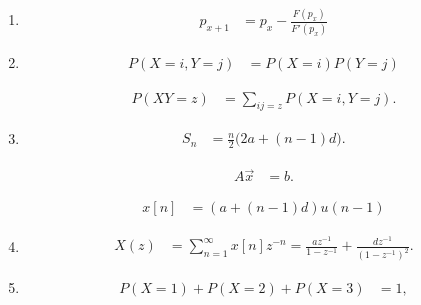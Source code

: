 \begin{enumerate}[label=\thesubsection.\arabic*, ref=\thesubsection.\theenumi, leftmargin=12mm, itemsep=4pt]

    \setcounter{enumi}{0}
    \item[\ref{question-short:C10-Q01}]
    \begin{align}
        p_{x+1} &= p_x-\frac{F(p_x)}{F'(p_x)}
        \label{formula:C10-Q01-F02}
    \end{align}

    \setcounter{enumi}{1}
    \item[\ref{question-short:C10-Q03}]
    \begin{align}
        P(X=i,Y=j) &= P(X=i)P(Y=j)
        \label{formula:C10-Q03-F01}
    \end{align}

    \begin{align}
        P(XY=z) &= \sum_{ij=z}P(X=i,Y=j).
        \label{formula:C10-Q03}
    \end{align}

    \setcounter{enumi}{2}
    \item[\ref{question-short:C10-Q08}]
    \begin{align}
        S_n &= \frac n2\bigl(2a+(n-1)d\bigr).
        \label{formula:C10-Q08-F01}
    \end{align}

    \begin{align}
	A\vec{x} &= b.
        \label{formula:C10-Q08}
    \end{align}

    \begin{align}
	    x[n] &=(a+(n-1)d)u(n-1)
	     \label{formula:C10-Q08-F03}
    \end{align}

    \setcounter{enumi}{4}
    \item[\ref{question-short:C10-Q11}]
    \begin{align}
        X(z) &= \sum_{n=1}^{\infty}x[n]z^{-n}
        = \frac{az^{-1}}{1-z^{-1}}
        + \frac{dz^{-1}}{(1-z^{-1})^2}.
        \label{formula:C10-Q11}
    \end{align}

    \setcounter{enumi}{5}
    \item[\ref{question-short:C10-Q15}]
    \begin{align}
	    	P(X=1)+P(X=2)+P(X=3) &= 1,
        \label{formula:C10-Q15}
    \end{align}


\end{enumerate}

